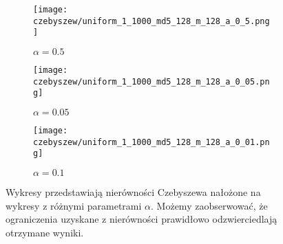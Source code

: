 \begin{figure}[H]
    \begin{subfigure}{0.32\textwidth}
        \texttt{[image: czebyszew/uniform\_1\_1000\_md5\_128\_m\_128\_a\_0\_5.png]}
        \caption{$\alpha = 0.5$}
        \label{fig:subim2}
    \end{subfigure}
    \begin{subfigure}{0.32\textwidth}
        \texttt{[image: czebyszew/uniform\_1\_1000\_md5\_128\_m\_128\_a\_0\_05.png]}
        \caption{$\alpha = 0.05$}
        \label{fig:subim2}
    \end{subfigure}
    \begin{subfigure}{0.32\textwidth}
        \texttt{[image: czebyszew/uniform\_1\_1000\_md5\_128\_m\_128\_a\_0\_01.png]}
        \caption{$\alpha = 0.1$}
        \label{fig:subim2}
    \end{subfigure}

    \caption{Wykresy przedstawiają nierówności Czebyszewa nałożone na wykresy z różnymi parametrami $\alpha$. Możemy zaobserwować, że ograniczenia uzyskane z nierówności prawidłowo odzwierciedlają otrzymane wyniki.}
    \label{fig:uniform_md5}
\end{figure}